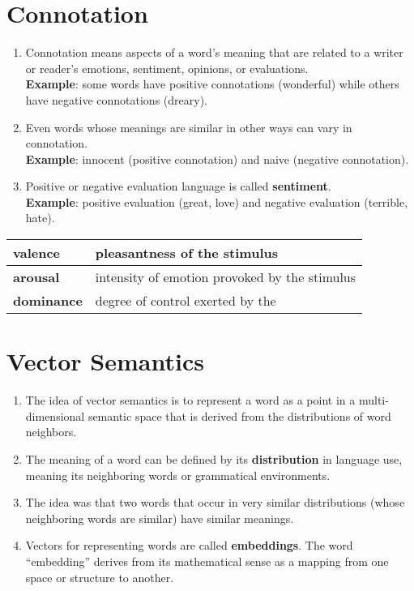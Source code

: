 \section{Connotation \cite{nlp-1}}\label{Connotation}
\begin{enumerate}
    \item Connotation means aspects of a word’s meaning that are related to a writer or reader’s emotions, sentiment, opinions, or evaluations.\\
    \textbf{Example}: some words have positive connotations (wonderful) while others have negative connotations (dreary).

    \item Even words whose meanings are similar in other ways can vary in connotation.\\
    \textbf{Example}: innocent (positive connotation) and naive (negative connotation).

    \item Positive or negative evaluation language is called \textbf{sentiment}.\\
    \textbf{Example}: positive evaluation (great, love) and negative evaluation (terrible, hate). 
\end{enumerate}

\begin{table}[h!]
    \centering
    \begin{tabular}{|l|p{7cm}|}
        \hline
        \textbf{valence} & pleasantness of the stimulus \\
        \hline
        \textbf{arousal} & intensity of emotion provoked by the stimulus \\
        \hline
        \textbf{dominance} & degree of control exerted by the \\
        \hline
    \end{tabular}
\end{table}

\section{Vector Semantics \cite{nlp-1}}\label{Vector Semantics}
\begin{enumerate}
    \item The idea of vector semantics is to represent a word as a point in a multi-dimensional semantic space that is derived from the distributions of word neighbors.

    \item The meaning of a word can be defined by its \textbf{distribution} in language use, meaning its neighboring words or grammatical environments. 

    \item The idea was that two words that occur in very similar distributions (whose neighboring words are similar) have similar meanings.

    \item Vectors for representing words are called \textbf{embeddings}. The word “embedding” derives from its mathematical sense as a mapping from one space or structure to another.

\end{enumerate}

